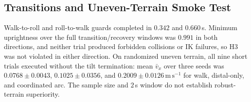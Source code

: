 \begin{table}[t]
\caption{Stair top-reaching outcomes (one deterministic trial)}
\label{tab:stairs}
\centering\small
{}
\end{table}

\subsection{Transitions and Uneven-Terrain Smoke Test}

Walk-to-roll and roll-to-walk guards completed in $0.342$ and $0.660\,$s.
Minimum uprightness over the full transition/recovery windows was $0.991$ in
both directions, and neither trial produced forbidden collisions or IK failures,
so H3 was not violated in either direction. On randomized uneven terrain, all
nine short trials executed without the tilt termination: mean $\bar v_x$ over
three seeds was $0.0768\pm0.0043$, $0.1025\pm0.0356$, and
$0.2009\pm0.0126\,\mathrm{m\,s^{-1}}$ for walk, distal-only, and coordinated arc.
The sample size and $2\,$s window do not establish robust-terrain superiority.
